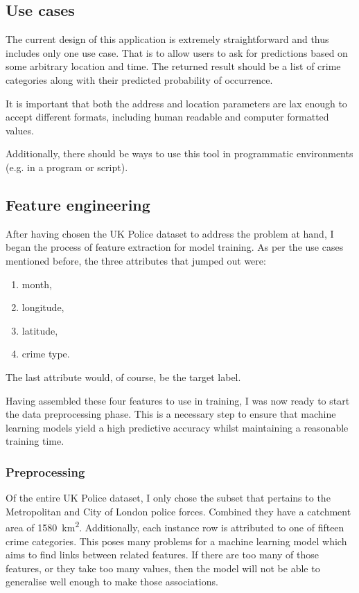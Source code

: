 \documentclass{article}
\begin{document}
	\subsection{Use cases}

	The current design of this application is extremely straightforward and thus includes only one use case. That is to allow users to ask for predictions based on some arbitrary location and time. The returned result should be a list of crime categories along with their predicted probability of occurrence.

	It is important that both the address and location parameters are lax enough to accept different formats, including human readable and computer formatted values.

	Additionally, there should be ways to use this tool in programmatic environments (e.g. in a program or script).

	\subsection{Feature engineering}

	After having chosen the UK Police dataset to address the problem at hand, I began the process of feature extraction for model training. As per the use cases mentioned before, the three attributes that jumped out were:

	\begin{enumerate}
		\item month,
		\item longitude,
		\item latitude,
		\item crime type.
	\end{enumerate}

	The last attribute would, of course, be the target label.

	Having assembled these four features to use in training, I was now ready to start the data preprocessing phase. This is a necessary step to ensure that machine learning models yield a high predictive accuracy whilst maintaining a reasonable training time.

	\subsubsection{Preprocessing}

	Of the entire UK Police dataset, I only chose the subset that pertains to the Metropolitan and City of London police forces. Combined they have a catchment area of \SI{1580}{\kilo\metre\squared}. Additionally, each instance row is attributed to one of fifteen crime categories.  This poses many problems for a machine learning model which aims to find links between related features. If there are too many of those features, or they take too many values, then the model will not be able to generalise well enough to make those associations.
\end{document}
